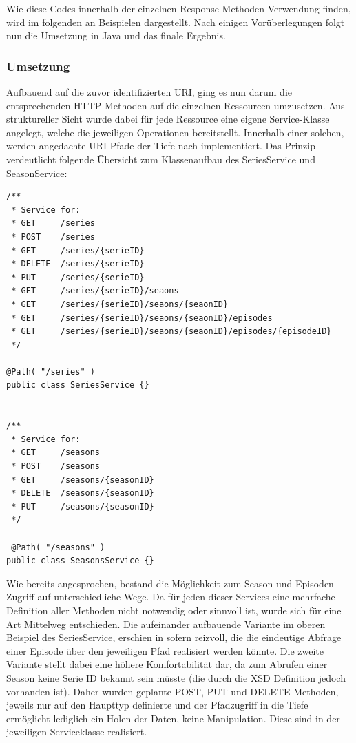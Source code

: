 \documentclass[a4paper]{article}
\begin{document}
Wie diese Codes innerhalb der einzelnen Response-Methoden Verwendung finden, wird im folgenden an Beispielen dargestellt. Nach einigen Vorüberlegungen folgt nun die Umsetzung in Java und das finale Ergebnis.  

\newpage
\subsubsection{Umsetzung}

Aufbauend auf die zuvor identifizierten URI, ging es nun darum die entsprechenden HTTP Methoden auf die einzelnen Ressourcen umzusetzen. Aus struktureller Sicht wurde dabei für jede Ressource eine eigene Service-Klasse angelegt, welche die jeweiligen Operationen bereitstellt. Innerhalb einer solchen, werden angedachte URI Pfade der Tiefe nach implementiert. Das Prinzip verdeutlicht folgende Übersicht zum Klassenaufbau des SeriesService und SeasonService:

\begin{lstlisting}[label=listsservice,caption= Klassenaufbau von BeispielServices]
/**
 * Service for:
 * GET     /series
 * POST    /series
 * GET     /series/{serieID}
 * DELETE  /series/{serieID}
 * PUT     /series/{serieID}
 * GET     /series/{serieID}/seaons
 * GET     /series/{serieID}/seaons/{seaonID}
 * GET     /series/{serieID}/seaons/{seaonID}/episodes
 * GET     /series/{serieID}/seaons/{seaonID}/episodes/{episodeID}
 */

@Path( "/series" )
public class SeriesService {}


/**
 * Service for:
 * GET     /seasons
 * POST    /seasons
 * GET     /seasons/{seasonID}
 * DELETE  /seasons/{seasonID}
 * PUT     /seasons/{seasonID}
 */

 @Path( "/seasons" )
public class SeasonsService {}

\end{lstlisting}

Wie bereits angesprochen, bestand die Möglichkeit zum Season und Episoden Zugriff auf unterschiedliche Wege. Da für jeden dieser Services eine mehrfache Definition aller Methoden nicht notwendig oder sinnvoll ist, wurde sich für eine Art Mittelweg entschieden. Die aufeinander aufbauende Variante im oberen Beispiel des SeriesService, erschien in sofern reizvoll, die die eindeutige Abfrage einer Episode über den jeweiligen Pfad realisiert werden könnte. Die zweite Variante stellt dabei eine höhere Komfortabilität dar, da zum Abrufen einer Season keine Serie ID bekannt sein müsste (die durch die XSD Definition jedoch vorhanden ist). 
Daher wurden geplante POST, PUT und DELETE Methoden, jeweils nur auf den Haupttyp definierte und der Pfadzugriff in die Tiefe ermöglicht lediglich ein Holen der Daten, keine Manipulation. Diese sind in der jeweiligen Serviceklasse realisiert.
\end{document}
